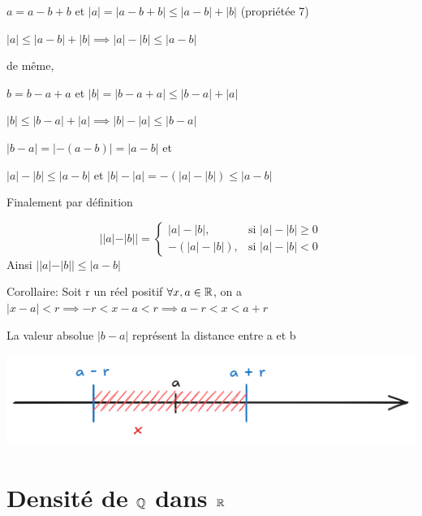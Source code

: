 \documentclass[a4paper, 12pt]{article}
\begin{document}
\begin{demonstration}
    $a = a - b + b$ \quad et \quad $|a| = |a - b + b| \leq |a - b| + |b|$ (propriétée 7)

    $|a| \leq |a - b| + |b| \implies |a| - |b| \leq |a - b|$

    \vspace{0.5em}
    de même, 
    \vspace{0.5em}
    
    $b = b - a + a$ \quad et \quad $|b| = |b - a + a| \leq |b - a| + |a|$
    
    $|b| \leq |b - a| + |a| \implies |b| - |a| \leq |b - a|$
    
    \vspace{0.5em}

    $|b - a| = |-(a-b)| = |a-b|$ et
    
    $|a| - |b| \leq |a-b|$ \quad et \quad $|b| - |a| = -(|a| - |b|) \leq |a-b|$

    Finalement par définition

    \begin{equation*}
        ||a|-|b|| =
        \begin{cases}
            |a| - |b|, & \text{si } |a| - |b| \geq 0 \\
            -(|a| - |b|), & \text{si } |a| - |b| \lt 0
        \end{cases}
    \end{equation*}
    Ainsi $||a| - |b|| \leq |a - b|$
\end{demonstration}

Corollaire: Soit r un réel positif $\forall x, a \in \mathbb{R}$, on a 
$|x - a| \lt r \implies -r \lt x - a \lt r \implies a-r \lt x \lt a + r$

\begin{remarque}
    La valeur absolue $|b - a|$ représent la distance entre a et b
\end{remarque}

\includegraphics[width=\textwidth]{../images/neightborhood.png}

\section{Densité de $\mathbb{Q}$ dans $\mathbb{R}$}
\end{document}
